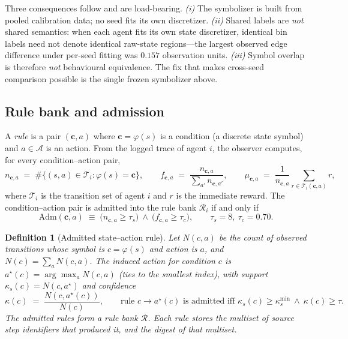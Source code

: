 \documentclass[11pt]{article}
\newtheorem{definition}{Definition}
\begin{document}
\noindent Three consequences follow and are load-bearing. \emph{(i)} The symbolizer is built from pooled
calibration data; no seed fits its own discretizer. \emph{(ii)} Shared labels are \emph{not} shared
semantics: when each agent fits its own state discretizer, identical bin labels need not denote
identical raw-state regions---the largest observed edge difference under per-seed fitting was
$0.157$ observation units. \emph{(iii)} Symbol overlap is therefore \emph{not} behavioural equivalence.
The fix that makes cross-seed comparison possible is the single frozen symbolizer above.

\subsection{Rule bank and admission}
\label{sec:method:rules}

A \emph{rule} is a pair $(\mathbf{c},a)$ where $\mathbf{c}=\varphi(s)$ is a condition (a discrete
state symbol) and $a\in\mathcal{A}$ is an action. From the logged trace of agent $i$, the observer
computes, for every condition--action pair,
\begin{equation}
n_{\mathbf{c},a} \;=\; \#\{(s,a)\in \mathcal{T}_i : \varphi(s)=\mathbf{c}\},
\qquad
f_{\mathbf{c},a} \;=\; \frac{n_{\mathbf{c},a}}{\sum_{a'} n_{\mathbf{c},a'}},
\qquad
\mu_{\mathbf{c},a} \;=\; \frac{1}{n_{\mathbf{c},a}}\sum_{r\in \mathcal{T}_i(\mathbf{c},a)} r,
\label{eq:rulestats}
\end{equation}
where $\mathcal{T}_i$ is the transition set of agent $i$ and $r$ is the immediate reward. The
condition--action pair is admitted into the rule bank $\mathcal{R}_i$ if and only if
\begin{equation}
\mathrm{Adm}(\mathbf{c},a)\;\equiv\;\big(n_{\mathbf{c},a}\ge \tau_{s}\big)\ \wedge\ \big(f_{\mathbf{c},a}\ge \tau_{c}\big),
\qquad \tau_{s}=8,\ \tau_{c}=0.70 .
\label{eq:admission}
\end{equation}

\begin{definition}[Admitted state--action rule]
\label{def:rule}
Let $N(c,a)$ be the count of observed transitions whose symbol is $c=\varphi(s)$ and action is $a$,
and $N(c)=\sum_{a}N(c,a)$. The induced action for condition $c$ is
$a^{\star}(c)=\arg\max_{a}N(c,a)$ (ties to the smallest index), with support
$\kappa_{s}(c)=N(c,a^{\star})$ and confidence
\begin{equation}
\kappa(c) \;=\; \frac{N(c,a^{\star}(c))}{N(c)},
\qquad
\text{rule } c\!\rightarrow\!a^{\star}(c) \text{ is admitted iff }
\kappa_{s}(c)\ge \kappa_{s}^{\min}\ \wedge\ \kappa(c)\ge \tau .
\label{eq:rule:def}
\end{equation}
The admitted rules form a rule bank $\mathcal{R}$. Each rule stores the multiset of source step
identifiers that produced it, and the digest of that multiset.
\end{definition}
\end{document}
